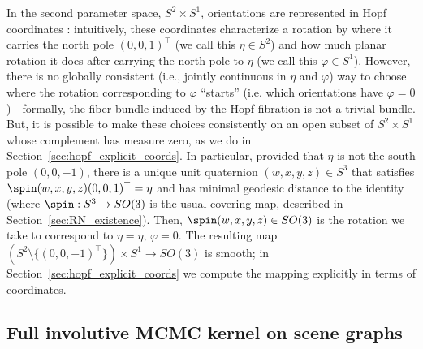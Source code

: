 In the second parameter space, $S^2 \times S^1$, orientations are represented in Hopf coordinates \cite{yershova2010hopf}:
intuitively, these coordinates characterize a rotation by where it carries the north pole $(0, 0, 1)^\top$ (we call this $\eta \in S^2$) and how much planar rotation it does after carrying the north pole to $\eta$ (we call this $\varphi \in S^1$).
However, there is no globally consistent (i.e., jointly continuous in $\eta$ and $\varphi$) way to choose where the rotation corresponding to $\varphi$ ``starts'' (i.e. which orientations have $\varphi = 0$)---formally, the fiber bundle induced by the Hopf fibration is not a trivial bundle.
But, it is possible to make these choices consistently on an open subset of $S^2 \times S^1$ whose complement has measure zero, as we do in Section~\ref{sec:hopf_explicit_coords}.
In particular, provided that $\eta$ is not the south pole $(0, 0, -1)$, there is a unique unit quaternion $(w, x, y, z) \in S^3$ that satisfies $\spin(w, x, y, z) (0, 0, 1)^\top = \eta$ and has minimal geodesic distance to the identity (where $\spin: S^3 \to SO(3)$ is the usual covering map, described in Section~\ref{sec:RN_existence}).
Then, $\spin(w, x, y, z) \in SO(3)$ is the rotation we take to correspond to $\eta=\eta$, $\varphi=0$.
The resulting map $(S^2 \setminus \{ (0, 0, -1)^\top \}) \times S^1 \to SO(3)$ is smooth; in Section~\ref{sec:hopf_explicit_coords} we compute the mapping explicitly in terms of coordinates.


\subsection{Full involutive MCMC kernel on scene graphs}

